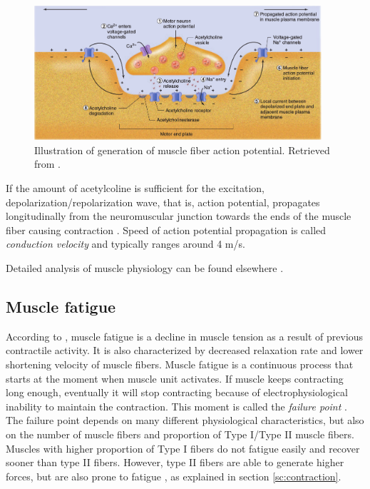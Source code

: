 \begin{figure}[ht]
\centering
\includegraphics[width=0.95\textwidth]{Images/introduction/action_potential_generation.png}
\caption{Illustration of generation of muscle fiber action potential. Retrieved from \citet{Widmaier2014}.}
\label{fig:action_potential_generation}
\end{figure}
  
If the amount of acetylcoline is sufficient for the excitation, depolarization/repolarization wave, that is, action potential, propagates longitudinally from the neuromuscular junction towards the ends of the muscle fiber causing contraction \citep{Henneberg1999}. Speed of action potential propagation is called \emph{conduction velocity} and typically ranges around 4 m/s.

Detailed analysis of muscle physiology can be found elsewhere \citep{Squire1986, Widmaier2014}.



\subsection{Muscle fatigue} \label{sc:fatigue}

According to \citet{Widmaier2014}, muscle fatigue is a decline in muscle tension as a result of previous contractile activity. It is also characterized by decreased relaxation rate and lower shortening velocity of muscle fibers. Muscle fatigue is a continuous process that starts at the moment when muscle unit activates. If muscle keeps contracting long enough, eventually it will stop contracting because of electrophysiological inability to maintain the contraction. This moment is called the \emph{failure point} \citep{DeLuca1984}. The failure point depends on many different physiological characteristics, but also on the number of muscle fibers and proportion of Type I/Type II muscle fibers. Muscles with higher proportion of Type I fibers do not fatigue easily and recover sooner than type II fibers. However, type II fibers are able to generate higher forces, but are also prone to fatigue \citep{Kupa1995}, as explained in section \ref{sc:contraction}.

